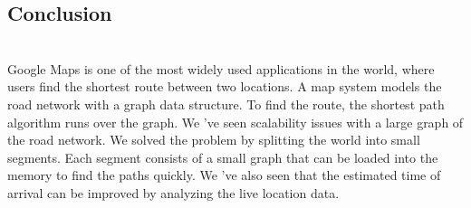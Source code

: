 \subsection{Conclusion}\label{KREdKUWIuYcjc09aq7Vem}
\\
Google Maps is one of the most widely used applications in the world, where users find the shortest route between two locations. A map system models the road network with a graph data structure. To find the route, the shortest path algorithm runs over the graph. We 've seen scalability issues with a large graph of the road network. We solved the problem by splitting the world into small segments. Each segment consists of a small graph that can be loaded into the memory to find the paths quickly. We
've also seen that the estimated time of arrival can be improved by analyzing the live location data.

